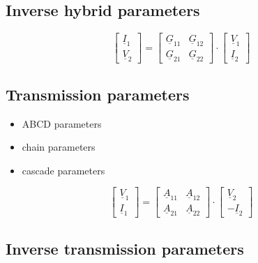 \documentclass{article}[11pt]
\begin{document}
\subsection{Inverse hybrid parameters}

\begin{equation}
\begin{bmatrix}
\underline{I}_{\mathrm{1}} \\
\underline{V}_{\mathrm{2}} 
\end{bmatrix}
=
\begin{bmatrix}
\underline{G}_{\mathrm{11}} & \underline{G}_{\mathrm{12}} \\
\underline{G}_{\mathrm{21}} & \underline{G}_{\mathrm{22}}
\end{bmatrix}
\cdot
\begin{bmatrix}
\underline{V}_{\mathrm{1}} \\
\underline{I}_{\mathrm{2}} 
\end{bmatrix}
\end{equation}

\subsection{Transmission parameters}

\begin{itemize}
  \item ABCD parameters
  \item chain parameters
  \item cascade parameters
\end{itemize}

\begin{equation}
\begin{bmatrix}
\underline{V}_{\mathrm{1}} \\
\underline{I}_{\mathrm{1}} 
\end{bmatrix}
=
\begin{bmatrix}
\underline{A}_{\mathrm{11}} & \underline{A}_{\mathrm{12}} \\
\underline{A}_{\mathrm{21}} & \underline{A}_{\mathrm{22}}
\end{bmatrix}
\cdot
\begin{bmatrix}
 \underline{V}_{\mathrm{2}} \\
-\underline{I}_{\mathrm{2}} 
\end{bmatrix}
\end{equation}

\subsection{Inverse transmission parameters}
\end{document}
